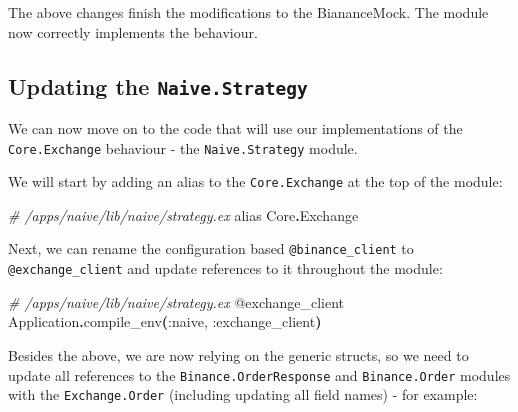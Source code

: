 \documentclass[
  oneside]{book}
\newenvironment{Shaded}{\begin{snugshade}}{\end{snugshade}}
\newcommand{\CommentTok}[1]{\textcolor[rgb]{0.56,0.35,0.01}{\textit{#1}}}
\newcommand{\ConstantTok}[1]{\textcolor[rgb]{0.56,0.35,0.01}{#1}}
\newcommand{\FunctionTok}[1]{\textcolor[rgb]{0.13,0.29,0.53}{\textbf{#1}}}
\newcommand{\ImportTok}[1]{#1}
\newcommand{\NormalTok}[1]{#1}
\newcommand{\OperatorTok}[1]{\textcolor[rgb]{0.81,0.36,0.00}{\textbf{#1}}}
\newcommand{\OtherTok}[1]{\textcolor[rgb]{0.56,0.35,0.01}{#1}}
\newcommand{\VariableTok}[1]{\textcolor[rgb]{0.00,0.00,0.00}{#1}}
\begin{document}
The above changes finish the modifications to the BiananceMock. The module now correctly implements the behaviour.

\subsection{\texorpdfstring{Updating the \texttt{Naive.Strategy}}{Updating the Naive.Strategy}}\label{updating-the-naive.strategy}

We can now move on to the code that will use our implementations of the \texttt{Core.Exchange} behaviour - the \texttt{Naive.Strategy} module.

We will start by adding an alias to the \texttt{Core.Exchange} at the top of the module:

\begin{Shaded}
\begin{Highlighting}[]
  \CommentTok{\# /apps/naive/lib/naive/strategy.ex}
  \ImportTok{alias} \ConstantTok{Core}\OperatorTok{.}\ConstantTok{Exchange}
\end{Highlighting}
\end{Shaded}

Next, we can rename the configuration based \texttt{@binance\_client} to \texttt{@exchange\_client} and update references to it throughout the module:

\begin{Shaded}
\begin{Highlighting}[]
  \CommentTok{\# /apps/naive/lib/naive/strategy.ex}
  \OtherTok{@exchange\_client} \ConstantTok{Application}\OperatorTok{.}\NormalTok{compile\_env}\FunctionTok{(}\VariableTok{:naive}\NormalTok{, }\VariableTok{:exchange\_client}\FunctionTok{)}
\end{Highlighting}
\end{Shaded}

Besides the above, we are now relying on the generic structs, so we need to update all references to the \texttt{Binance.OrderResponse} and \texttt{Binance.Order} modules with the \texttt{Exchange.Order} (including updating all field names) - for example:
\end{document}
